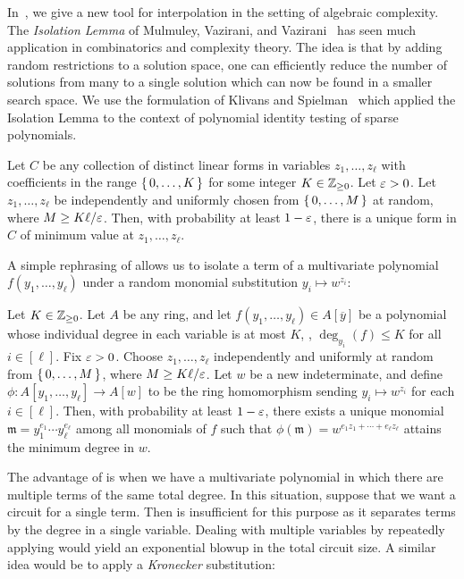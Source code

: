 \documentclass[letterpaper, 11pt]{amsart}
\begin{document}
In~\cite{DG25}, we give a new tool for interpolation in the setting of algebraic complexity.
The \emph{Isolation Lemma} of Mulmuley, Vazirani, and Vazirani~\cite{MVV87} has seen much application in combinatorics and complexity theory.
The idea is that by adding random restrictions to a solution space, one can efficiently reduce the number of solutions from many to a single solution which can now be found in a smaller search space.
We use the formulation of Klivans and Spielman~\cite{KS01} which applied the Isolation Lemma to the context of polynomial identity testing of sparse polynomials.

\begin{lem}[{\cite[Lemma 4]{KS01}}]\label{lem:isolation_forms}
  Let $C$ be any collection of distinct linear forms in variables $z_1, \ldots, z_\ell$ with coefficients in the range $\set{0, \ldots, K}$ for some integer $K \in \mathbb{Z}_{\geq 0}$.
  Let $\varepsilon > 0$.
  Let $z_1, \ldots, z_\ell$ be independently and uniformly chosen from $\set{0, \ldots, M}$ at random, where $M\geq K \ell / \varepsilon$.
  Then, with probability at least $1 - \varepsilon$, there is a unique form in $C$ of minimum value at $z_1, \ldots, z_\ell$.
\end{lem}

A simple rephrasing of  allows us to isolate a term of a multivariate polynomial $f(y_1,\dots,y_\ell)$ under a random monomial substitution $y_i\mapsto w^{z_i}$:
\begin{cor}[{\cite[Corollary 2.27]{DG25}}]\label{cor:isolation_exponents}
  Let $K \in \mathbb{Z}_{\geq 0}$.
  Let $A$ be any ring, and let $f(y_1, \ldots, y_\ell) \in A[\overline{y}]$ be a polynomial whose individual degree in each variable is at most $K$, \ie, $\deg_{y_i}(f) \leq K$ for all $i \in [\ell]$.
  Fix $\varepsilon > 0$.
  Choose $z_1, \ldots, z_\ell$ independently and uniformly at random from $\set{0, \ldots, M}$, where $M \geq K\ell/\varepsilon$.
  Let $w$ be a new indeterminate, and define $\phi \colon A[y_1, \ldots, y_\ell] \to A[w]$ to be the ring homomorphism sending $y_i \mapsto w^{z_i}$ for each $i \in [\ell]$.
  Then, with probability at least $1 - \varepsilon$, there exists a unique monomial $\mathfrak{m} = y_1^{e_1}\cdots y_\ell^{e_\ell}$ among all monomials of $f$ such that  $\phi(\mathfrak{m}) = w^{e_1 z_1 + \cdots + e_\ell z_\ell}$ attains the minimum degree in $w$.
\end{cor}

The advantage of  is when we have a multivariate polynomial in which there are multiple terms of the same total degree.
In this situation, suppose that we want a circuit for a single term.
Then  is insufficient for this purpose as it separates terms by the degree in a single variable.
Dealing with multiple variables by repeatedly applying  would yield an exponential blowup in the total circuit size.
A similar idea would be to apply a \emph{Kronecker} substitution:
\end{document}
